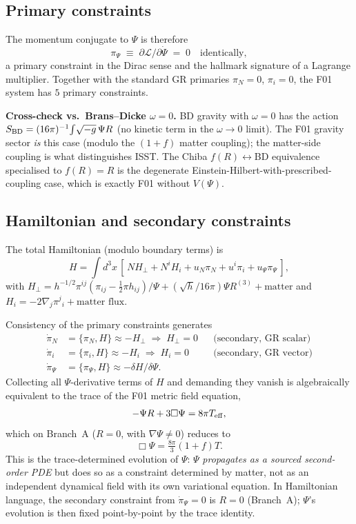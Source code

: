 \documentclass[aps,prd,twocolumn,nofootinbib,floatfix,superscriptaddress]{revtex4-2}
\begin{document}
\subsection{Primary constraints}

The momentum conjugate to $\Psi$ is therefore
\begin{equation}
\pi_\Psi \;\equiv\; \partial\mathcal L/\partial\dot\Psi
\;=\; 0\quad\text{identically},
\end{equation}
a primary constraint in the Dirac sense and the hallmark signature
of a Lagrange multiplier. Together with the standard GR primaries
$\pi_N=0$, $\pi_i=0$, the F01 system has $5$ primary constraints.

\textbf{Cross-check vs.\ Brans--Dicke $\omega=0$.} BD gravity with
$\omega=0$ has the action
$S_{\rm BD} = (16\pi)^{-1}\!\int\!\sqrt{-g}\,\Psi R$ (no kinetic
term in the $\omega\to 0$ limit). The F01 gravity sector
\emph{is} this case (modulo the $(1+f)$ matter coupling); the
matter-side coupling is what distinguishes ISST. The Chiba
$f(R)\leftrightarrow$BD equivalence specialised to $f(R)=R$ is the
degenerate Einstein-Hilbert-with-prescribed-coupling case, which
is exactly F01 without $V(\Psi)$.

\subsection{Hamiltonian and secondary constraints}

The total Hamiltonian (modulo boundary terms) is
\begin{equation}
H = \int d^3x\,[\,N H_\perp + N^i H_i + u_N \pi_N + u^i\pi_i + u_\Psi\pi_\Psi\,],
\end{equation}
with $H_\perp=h^{-1/2}\pi^{ij}(\pi_{ij}-\tfrac12\pi h_{ij})/\Psi
+(\sqrt{h}/16\pi)\Psi R^{(3)}+\text{matter}$ and
$H_i=-2\nabla_j\pi^j{}_i+\text{matter flux}$.

Consistency of the primary constraints generates
\begin{align}
\dot\pi_N &= \{\pi_N,H\} \approx -H_\perp\;\Rightarrow\;H_\perp=0
&&\text{(secondary, GR scalar)} \\
\dot\pi_i &= \{\pi_i,H\} \approx -H_i\;\Rightarrow\;H_i=0
&&\text{(secondary, GR vector)} \\
\dot\pi_\Psi &= \{\pi_\Psi,H\} \approx -\delta H/\delta\Psi.
\end{align}
Collecting all $\Psi$-derivative terms of $H$ and demanding they
vanish is algebraically equivalent to the trace of the F01 metric
field equation,
\begin{equation}
-\Psi R + 3\Box\Psi = 8\pi T_{\rm eff},
\end{equation}
which on Branch~A ($R=0$, with $\nabla\Psi\neq 0$) reduces to
\begin{equation}
\Box\Psi = \tfrac{8\pi}{3}(1+f)T.
\end{equation}
This is the trace-determined evolution of $\Psi$: $\Psi$
\emph{propagates as a sourced second-order PDE} but does so as a
constraint determined by matter, not as an independent dynamical
field with its own variational equation. In Hamiltonian language,
the secondary constraint from $\dot\pi_\Psi=0$ is $R=0$ (Branch~A);
$\Psi$'s evolution is then fixed point-by-point by the trace
identity.
\end{document}
